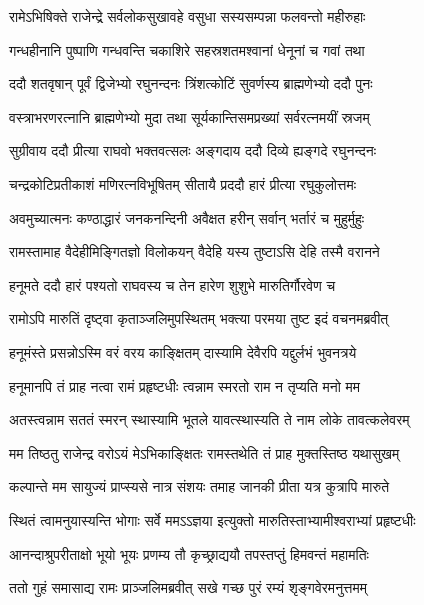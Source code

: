 \twolineshloka
{रामेऽभिषिक्ते राजेन्द्रे सर्वलोकसुखावहे}
{वसुधा सस्यसम्पन्ना फलवन्तो महीरुहाः} %

\twolineshloka
{गन्धहीनानि पुष्पाणि गन्धवन्ति चकाशिरे}
{सहस्रशतमश्वानां धेनूनां च गवां तथा} %

\twolineshloka
{ददौ शतवृषान् पूर्वं द्विजेभ्यो रघुनन्दनः}
{त्रिंशत्कोटिं सुवर्णस्य ब्राह्मणेभ्यो ददौ पुनः} %

\twolineshloka
{वस्त्राभरणरत्नानि ब्राह्मणेभ्यो मुदा तथा}
{सूर्यकान्तिसमप्रख्यां सर्वरत्नमयीं स्रजम्} %

\twolineshloka
{सुग्रीवाय ददौ प्रीत्या राघवो भक्तवत्सलः}
{अङ्गदाय ददौ दिव्ये ह्यङ्गदे रघुनन्दनः} %

\twolineshloka
{चन्द्रकोटिप्रतीकाशं मणिरत्नविभूषितम्}
{सीतायै प्रददौ हारं प्रीत्या रघुकुलोत्तमः} %

\twolineshloka
{अवमुच्यात्मनः कण्ठाद्धारं जनकनन्दिनी}
{अवैक्षत हरीन् सर्वान् भर्तारं च मुहुर्मुहुः} %

\twolineshloka
{रामस्तामाह वैदेहीमिङ्गितज्ञो विलोकयन्}
{वैदेहि यस्य तुष्टाऽसि देहि तस्मै वरानने} %

\twolineshloka
{हनूमते ददौ हारं पश्यतो राघवस्य च}
{तेन हारेण शुशुभे मारुतिर्गौरवेण च} %

\twolineshloka
{रामोऽपि मारुतिं दृष्ट्वा कृताञ्जलिमुपस्थितम्}
{भक्त्या परमया तुष्ट इदं वचनमब्रवीत्} %

\twolineshloka
{हनूमंस्ते प्रसन्नोऽस्मि वरं वरय काङ्क्षितम्}
{दास्यामि देवैरपि यद्दुर्लभं भुवनत्रये} %

\twolineshloka
{हनूमानपि तं प्राह नत्वा रामं प्रहृष्टधीः}
{त्वन्नाम स्मरतो राम न तृप्यति मनो मम} %

\twolineshloka
{अतस्त्वन्नाम सततं स्मरन् स्थास्यामि भूतले}
{यावत्स्थास्यति ते नाम लोके तावत्कलेवरम्} %

\twolineshloka
{मम तिष्ठतु राजेन्द्र वरोऽयं मेऽभिकाङ्क्षितः}
{रामस्तथेति तं प्राह मुक्तस्तिष्ठ यथासुखम्} %

\twolineshloka
{कल्पान्ते मम सायुज्यं प्राप्स्यसे नात्र संशयः}
{तमाह जानकी प्रीता यत्र कुत्रापि मारुते} %

\twolineshloka
{स्थितं त्वामनुयास्यन्ति भोगाः सर्वे ममऽऽज्ञया}
{इत्युक्तो मारुतिस्ताभ्यामीश्वराभ्यां प्रहृष्टधीः} %

\twolineshloka
{आनन्दाश्रुपरीताक्षो भूयो भूयः प्रणम्य तौ}
{कृच्छ्राद्ययौ तपस्तप्तुं हिमवन्तं महामतिः} %

\twolineshloka
{ततो गुहं समासाद्य रामः प्राञ्जलिमब्रवीत्}
{सखे गच्छ पुरं रम्यं शृङ्गवेरमनुत्तमम्} %

